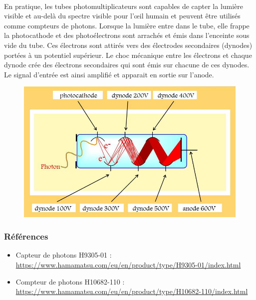 \documentclass{article}
\begin{document}
    \paragraph{}
    En pratique, les tubes photomultiplicateurs sont capables de capter la lumière visible et au-delà du spectre visible pour l'\oe il humain et peuvent être utilisés comme compteurs de photons. Lorsque la lumière entre dans le tube, elle frappe la photocathode et des photoélectrons sont arrachés et émis dans l'enceinte sous vide du tube. Ces électrons sont attirés vers des électrodes secondaires (dynodes) portées à un potentiel supérieur. Le choc mécanique entre les électrons et chaque dynode crée des électrons secondaires qui sont émis sur chacune de ces dynodes. Le signal d'entrée est ainsi amplifié et apparait en sortie sur l'anode.

    \begin{figure}[H]
        \centering
        \includegraphics[width=0.6\linewidth]{./images/photomultiplicateur.png}
    \end{figure}

    \subsubsection{Références}
    \begin{itemize}
        \item Capteur de photons H9305-01 : \url{https://www.hamamatsu.com/eu/en/product/type/H9305-01/index.html}
        \item Compteur de photons H10682-110 : \url{https://www.hamamatsu.com/eu/en/product/type/H10682-110/index.html}
    \end{itemize}
\end{document}
